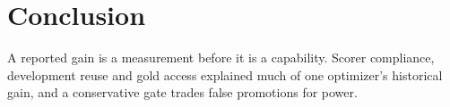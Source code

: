 \section{Conclusion}
\label{sec:conclusion}

A reported gain is a measurement before it is a capability. Scorer compliance, development reuse and gold access explained much of one optimizer's historical gain, and a conservative gate trades false promotions for power. 
